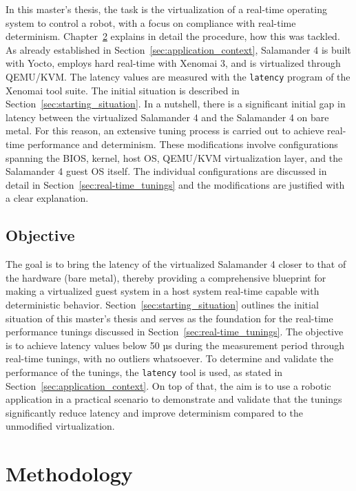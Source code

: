 \documentclass[MMR,Master,english]{style/twbook}
\begin{document}
\clearpage

\bigskip \noindent In this master's thesis, the task is the virtualization of a real-time operating system to control a robot, with a focus on compliance with real-time determinism. Chapter~\ref{cha:methodology} explains in detail the procedure, how this was tackled. As already established in Section~\ref{sec:application_context}, Salamander 4 is built with Yocto, employs hard real-time with Xenomai 3, and is virtualized through QEMU/KVM. The latency values are measured with the \texttt{latency} program of the Xenomai tool suite. The initial situation is described in Section~\ref{sec:starting_situation}. In a nutshell, there is a significant initial gap in latency between the virtualized Salamander 4 and the Salamander 4 on bare metal. For this reason, an extensive tuning process is carried out to achieve real-time performance and determinism. These modifications involve configurations spanning the BIOS, kernel, host OS, QEMU/KVM virtualization layer, and the Salamander 4 guest OS itself. The individual configurations are discussed in detail in Section~\ref{sec:real-time_tunings} and the modifications are justified with a clear explanation.

\section{Objective}
The goal is to bring the latency of the virtualized Salamander 4 closer to that of the hardware (bare metal), thereby providing a comprehensive blueprint for making a virtualized guest system in a host system real-time capable with deterministic behavior. Section~\ref{sec:starting_situation} outlines the initial situation of this master's thesis and serves as the foundation for the real-time performance tunings discussed in Section~\ref{sec:real-time_tunings}. The objective is to achieve latency values below 50 µs during the measurement period through real-time tunings, with no outliers whatsoever. To determine and validate the performance of the tunings, the \texttt{latency} tool is used, as stated in Section~\ref{sec:application_context}. On top of that, the aim is to use a robotic application in a practical scenario to demonstrate and validate that the tunings significantly reduce latency and improve determinism compared to the unmodified virtualization.

\clearpage

\chapter{Methodology}\label{cha:methodology}
\end{document}
